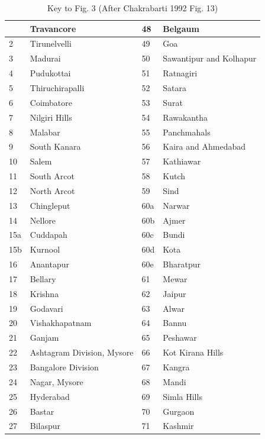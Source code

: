 {\fontsize{6}{7}\selectfont\begin{longtable}{|p{.35cm}|p{1.5cm}|p{.35cm}|p{1.9cm}|}
\caption{{\fontsize{6}{7}\selectfont Key to Fig. 3 (After Chakrabarti 1992 Fig. 13)}}\label{chapter1-fig004}\\

\hline
\endfirsthead
\hline
\endhead
\hline
\endfoot
\endlastfoot
1 & Travancore & 48 & Belgaum\\\hline
2 & Tirunelvelli & 49 & Goa\\\hline
3 & Madurai & 50 & Sawantipur and Kolhapur\\\hline
4 & Pudukottai & 51 & Ratnagiri \\\hline
5 & Thiruchirapalli  & 52 & Satara \\\hline
6 & Coimbatore & 53 & Surat \\\hline
7 & Nilgiri Hills & 54 & Rawakantha \\\hline
8 & Malabar & 55 & Panchmahals  \\\hline
9 & South Kanara & 56 & Kaira and Ahmedabad \\\hline
10 & Salem & 57 & Kathiawar\\\hline
11 & South Arcot & 58 & Kutch\\\hline
12 & North Arcot & 59 & Sind\\\hline
13 & Chingleput & 60a & Narwar \\\hline
14 & Nellore & 60b & Ajmer\\\hline
15a & Cuddapah & 60c & Bundi \\\hline
15b & Kurnool & 60d & Kota\\\hline
16 & Anantapur & 60e & Bharatpur \\\hline
17 & Bellary & 61 & Mewar \\
18 & Krishna & 62 & Jaipur \\\hline
19 & Godavari & 63 & Alwar \\\hline
20 & Vishakhapatnam & 64 & Bannu \\\hline
21 & Ganjam & 65 & Peshawar\\\hline
22 & Ashtagram Division, Mysore  & 66 & Kot Kirana Hills\\\hline
23 & Bangalore Division & 67 & Kangra \\\hline
24 & Nagar, Mysore & 68 & Mandi \\\hline
25 & Hyderabad & 69 & Simla Hills\\\hline
26 & Bastar & 70 & Gurgaon \\\hline
27 & Bilaspur  & 71 & Kashmir\\\hline

\end{longtable}}
